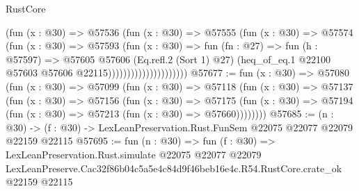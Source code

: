 \begin{lexlean}{RustCore}
\begin{coremodule}
                                  (fun (x : @30) =>
                                  @57536
                                    (fun (x : @30) =>
                                    @57555
                                      (fun (x : @30) =>
                                      @57574
                                        (fun (x : @30) =>
                                        @57593
                                          (fun (x : @30) =>
                                          fun (fn : @27) =>
                                          fun (h : @57597) =>
                                          @57605
                                            @57606
                                            (Eq.refl.{2} (Sort 1) @27)
                                            (heq_of_eq.{1}
                                              @22100
                                              @57603
                                              @57606
                                              @22115)))))))))))))))))))))
@57677 := fun (x : @30) =>
  @57080
    (fun (x : @30) =>
    @57099
      (fun (x : @30) =>
      @57118
        (fun (x : @30) =>
        @57137
          (fun (x : @30) =>
          @57156
            (fun (x : @30) =>
            @57175
              (fun (x : @30) => @57194 (fun (x : @30) => @57213 (fun (x : @30) => @57660))))))))
@57685 := (n : @30) ->
  (f : @30) -> LexLeanPreservation.Rust.FunSem @22075 @22077 @22079 @22159 @22115
@57695 := fun (n : @30) =>
  fun (f : @30) =>
  LexLeanPreservation.Rust.simulate
    @22075
    @22077
    @22079
    LexLeanPreserve.Cac32f86b04c5a5e4c84d9f46beb16e4c.R54.RustCore.crate_ok
    @22159
    @22115
\end{coremodule}
\end{lexlean}
